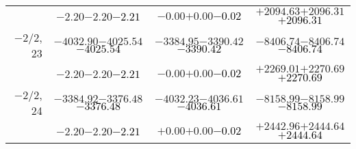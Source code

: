 \documentclass[compress]{beamer}
\begin{document}
\begin{frame}
{\begin{tabular}{r | c | c | c}
           & $-2.20$\hspace{0.1 cm}$-2.20$\hspace{0.1 cm}\textcolor{black}{$-2.21$} & $-0.00$\hspace{0.1 cm}$+0.00$\hspace{0.1 cm}\textcolor{black}{$-0.02$} & $+2094.63$\hspace{0.1 cm}$+2096.31$\hspace{0.1 cm}\textcolor{black}{$+2096.31$} \\
$-$2/2, 23 & $-4032.90$\hspace{0.1 cm}$-4025.54$\hspace{0.1 cm}\textcolor{black}{$-4025.54$} & $-3384.95$\hspace{0.1 cm}$-3390.42$\hspace{0.1 cm}\textcolor{black}{$-3390.42$} & $-8406.74$\hspace{0.1 cm}$-8406.74$\hspace{0.1 cm}\textcolor{black}{$-8406.74$} \\
           & $-2.20$\hspace{0.1 cm}$-2.20$\hspace{0.1 cm}\textcolor{black}{$-2.21$} & $-0.00$\hspace{0.1 cm}$+0.00$\hspace{0.1 cm}\textcolor{black}{$-0.02$} & $+2269.01$\hspace{0.1 cm}$+2270.69$\hspace{0.1 cm}\textcolor{black}{$+2270.69$} \\
$-$2/2, 24 & $-3384.92$\hspace{0.1 cm}$-3376.48$\hspace{0.1 cm}\textcolor{black}{$-3376.48$} & $-4032.23$\hspace{0.1 cm}$-4036.61$\hspace{0.1 cm}\textcolor{black}{$-4036.61$} & $-8158.99$\hspace{0.1 cm}$-8158.99$\hspace{0.1 cm}\textcolor{black}{$-8158.99$} \\
           & $-2.20$\hspace{0.1 cm}$-2.20$\hspace{0.1 cm}\textcolor{black}{$-2.21$} & $+0.00$\hspace{0.1 cm}$+0.00$\hspace{0.1 cm}\textcolor{black}{$-0.02$} & $+2442.96$\hspace{0.1 cm}$+2444.64$\hspace{0.1 cm}\textcolor{black}{$+2444.64$} \\
\end{tabular}}
\end{frame}
\end{document}
